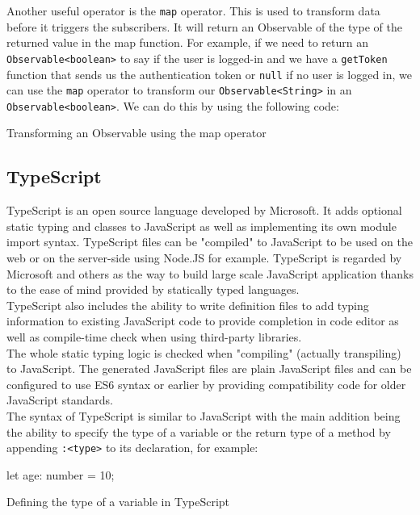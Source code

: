 \documentclass[twoside, openright,11pt,a4paper]{book}
\newenvironment{code}{\captionsetup{type=listing}}{}
\begin{document}
Another useful operator is the \verb+map+ operator. This is used to transform data before it triggers the subscribers. It will return an Observable of the type of the returned value in the map function. For example, if we need to return an \verb+Observable<boolean>+ to say if the user is logged-in and we have a \verb+getToken+ function that sends us the authentication token or \verb+null+ if no user is logged in, we can use the \verb+map+ operator to transform our \verb+Observable<String>+ in an \verb+Observable<boolean>+. We can do this by using the following code:
\begin{code}
	\caption{Transforming an Observable using the map operator}
\end{code}
\subsection{TypeScript}
TypeScript\cite{github:typescript} is an open source language developed by Microsoft. It adds optional static typing and classes to JavaScript as well as implementing its own module import syntax. TypeScript files can be "compiled" to JavaScript to be used on the web or on the server-side using Node.JS for example. TypeScript is regarded by Microsoft and others as the way to build large scale JavaScript application thanks to the ease of mind provided by statically typed languages. \\

TypeScript also includes the ability to write definition files to add typing information to existing JavaScript code to provide completion in code editor as well as compile-time check when using third-party libraries. \\

The whole static typing logic is checked when "compiling" (actually transpiling) to JavaScript. The generated JavaScript files are plain JavaScript files and can be configured to use ES6 syntax or earlier by providing compatibility code for older JavaScript standards. \\

The syntax of TypeScript is similar to JavaScript with the main addition being the ability to specify the type of a variable or the return type of a method by appending \verb+:<type>+ to its declaration, for example:
\begin{code}
	\begin{inlinets}
let age: number = 10;
	\end{inlinets}
	\caption{Defining the type of a variable in TypeScript}
\end{code}
\end{document}
